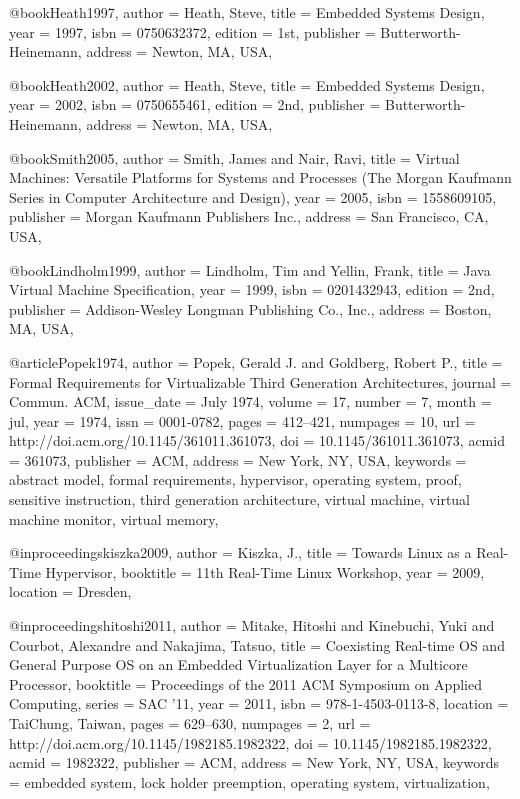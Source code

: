 @book{Heath1997,
 author = {Heath, Steve},
 title = {Embedded Systems Design},
 year = {1997},
 isbn = {0750632372},
 edition = {1st},
 publisher = {Butterworth-Heinemann},
 address = {Newton, MA, USA},
} 

@book{Heath2002,
 author = {Heath, Steve},
 title = {Embedded Systems Design},
 year = {2002},
 isbn = {0750655461},
 edition = {2nd},
 publisher = {Butterworth-Heinemann},
 address = {Newton, MA, USA},
} 


@book{Smith2005,
 author = {Smith, James and Nair, Ravi},
 title = {Virtual Machines: Versatile Platforms for Systems and Processes (The Morgan Kaufmann Series in Computer Architecture and Design)},
 year = {2005},
 isbn = {1558609105},
 publisher = {Morgan Kaufmann Publishers Inc.},
 address = {San Francisco, CA, USA},
} 

@book{Lindholm1999,
 author = {Lindholm, Tim and Yellin, Frank},
 title = {Java Virtual Machine Specification},
 year = {1999},
 isbn = {0201432943},
 edition = {2nd},
 publisher = {Addison-Wesley Longman Publishing Co., Inc.},
 address = {Boston, MA, USA},
} 

@article{Popek1974,
 author = {Popek, Gerald J. and Goldberg, Robert P.},
 title = {Formal Requirements for Virtualizable Third Generation Architectures},
 journal = {Commun. ACM},
 issue_date = {July 1974},
 volume = {17},
 number = {7},
 month = jul,
 year = {1974},
 issn = {0001-0782},
 pages = {412--421},
 numpages = {10},
 url = {http://doi.acm.org/10.1145/361011.361073},
 doi = {10.1145/361011.361073},
 acmid = {361073},
 publisher = {ACM},
 address = {New York, NY, USA},
 keywords = {abstract model, formal requirements, hypervisor, operating system, proof, sensitive instruction, third generation architecture, virtual machine, virtual machine monitor, virtual memory},
}

@inproceedings{kiszka2009,
 author = {Kiszka, J.},
 title = {Towards Linux as a Real-Time Hypervisor},
 booktitle = {11th Real-Time Linux Workshop},
 year = {2009},
 location = {Dresden},
}

@inproceedings{hitoshi2011,
 author = {Mitake, Hitoshi and Kinebuchi, Yuki and Courbot, Alexandre and Nakajima, Tatsuo},
 title = {Coexisting Real-time OS and General Purpose OS on an Embedded Virtualization Layer for a Multicore Processor},
 booktitle = {Proceedings of the 2011 ACM Symposium on Applied Computing},
 series = {SAC '11},
 year = {2011},
 isbn = {978-1-4503-0113-8},
 location = {TaiChung, Taiwan},
 pages = {629--630},
 numpages = {2},
 url = {http://doi.acm.org/10.1145/1982185.1982322},
 doi = {10.1145/1982185.1982322},
 acmid = {1982322},
 publisher = {ACM},
 address = {New York, NY, USA},
 keywords = {embedded system, lock holder preemption, operating system, virtualization},
} 

